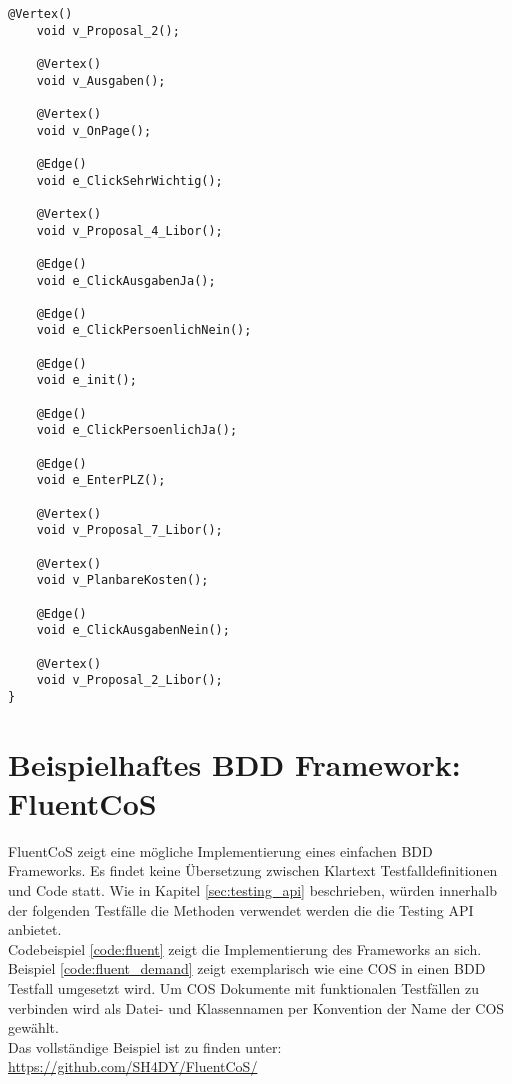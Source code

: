 \begin{lstlisting}[caption=ModellLogisch.java, label=code:gw_generated]
    @Vertex()
    void v_Proposal_2();

    @Vertex()
    void v_Ausgaben();

    @Vertex()
    void v_OnPage();

    @Edge()
    void e_ClickSehrWichtig();

    @Vertex()
    void v_Proposal_4_Libor();

    @Edge()
    void e_ClickAusgabenJa();

    @Edge()
    void e_ClickPersoenlichNein();

    @Edge()
    void e_init();

    @Edge()
    void e_ClickPersoenlichJa();

    @Edge()
    void e_EnterPLZ();

    @Vertex()
    void v_Proposal_7_Libor();

    @Vertex()
    void v_PlanbareKosten();

    @Edge()
    void e_ClickAusgabenNein();

    @Vertex()
    void v_Proposal_2_Libor();
}
\end{lstlisting}

\section{Beispielhaftes BDD Framework: FluentCoS}
FluentCoS zeigt eine mögliche Implementierung eines einfachen BDD Frameworks. Es findet keine Übersetzung zwischen Klartext Testfalldefinitionen und Code statt. Wie in Kapitel \ref{sec:testing_api} beschrieben, würden innerhalb der folgenden Testfälle die Methoden verwendet werden die die Testing API anbietet.\\

Codebeispiel \ref{code:fluent} zeigt die Implementierung des Frameworks an sich. Beispiel \ref{code:fluent_demand} zeigt exemplarisch wie eine \Gls{COS} in einen BDD Testfall umgesetzt wird. Um \Gls{COS} Dokumente mit funktionalen Testfällen zu verbinden wird als Datei- und Klassennamen per Konvention der Name der \Gls{COS} gewählt.\\

Das vollständige Beispiel ist zu finden unter: \url{https://github.com/SH4DY/FluentCoS/}

